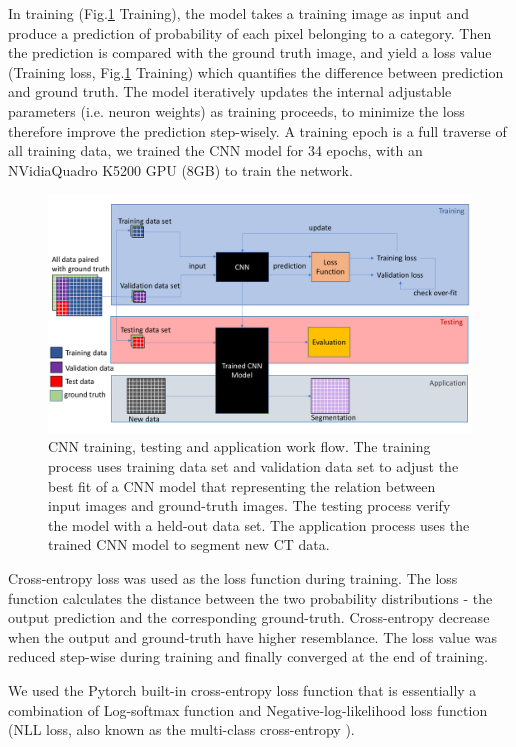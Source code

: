 \documentclass[draft,linenumbers]{agujournal2018}
\begin{document}
In training (Fig.\ref{workfl} Training), the model takes a training image as input and produce a prediction of probability of each pixel belonging to a category. Then the prediction is compared with the ground truth image, and yield a loss value (Training loss, Fig.\ref{workfl} Training) which quantifies the difference between prediction and ground truth. The model iteratively updates the internal adjustable parameters (i.e. neuron weights) as training proceeds, to minimize the loss therefore improve the prediction step-wisely. A training epoch is a full traverse of all training data, we trained the CNN model for 34 epochs, with an NVidia\texttrademark Quadro K5200 GPU (8GB) to train the network. 

\begin{figure}[h]
\centering
\includegraphics[width=33pc]{imgs/workfl.pdf}
\caption{CNN training, testing and application work flow. The training process uses training data set and validation data set to adjust the best fit of a CNN model that representing the relation between input images and ground-truth images. The testing process verify the model with a held-out data set. The application process uses the trained CNN model to segment new \textmu CT data.}
\label{workfl}
\end{figure}

Cross-entropy loss was used as the loss function during training. The loss function calculates the distance between the two probability distributions - the output prediction and the corresponding ground-truth. Cross-entropy decrease when the output and ground-truth have higher resemblance. The loss value was reduced step-wise during training and finally converged at the end of training. 

We used the Pytorch built-in cross-entropy loss function that is essentially a combination of Log-softmax function and Negative-log-likelihood loss function (NLL loss, also known as the multi-class cross-entropy \citep{bishop2006pattern}).
\end{document}
